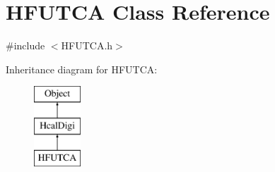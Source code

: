 \hypertarget{class_h_f_u_t_c_a}{}\section{H\+F\+U\+T\+C\+A Class Reference}
\label{class_h_f_u_t_c_a}


{\ttfamily \#include $<$H\+F\+U\+T\+C\+A.\+h$>$}

Inheritance diagram for H\+F\+U\+T\+C\+A\+:\begin{figure}[H]
\begin{center}
\leavevmode
\includegraphics[height=3.000000cm]{class_h_f_u_t_c_a}
\end{center}
\end{figure}
